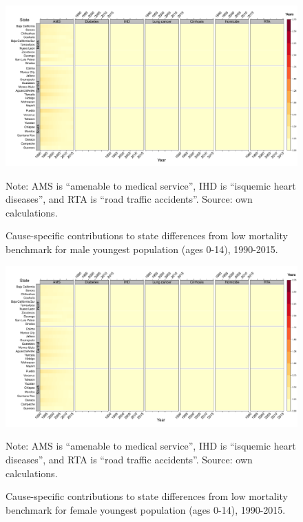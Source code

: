 \documentclass[11.5pt]{article}
\begin{document}
{\begin{figure}
\centering
\caption{Cause-specific contributions to state differences from low mortality benchmark for male youngest population (ages 0-14), 1990-2015.}
\label{fig:e0_14_males}
\includegraphics[scale=.3]{Young_Male_heatmap.pdf}

Note: AMS is ``amenable to medical service'', IHD is ``isquemic heart diseases'', and RTA is ``road traffic accidents''. Source: own calculations.\end{figure}

\begin{figure}
\centering
\caption{Cause-specific contributions to state differences from low mortality benchmark for female youngest population (ages 0-14), 1990-2015.} 
\label{fig:e0_14_females}
\includegraphics[scale=.3]{Young_Female_heatmap.pdf}

Note: AMS is ``amenable to medical service'', IHD is ``isquemic heart diseases'', and RTA is ``road traffic accidents''. Source: own calculations.
\end{figure}


}
\end{document}
